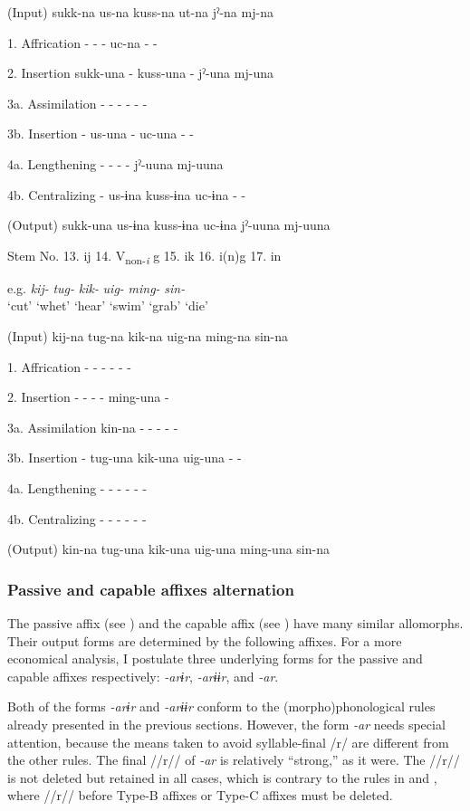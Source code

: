 \begin{table}
  (Input)  sukk-na  us-na  kuss-na  ut-na  jˀ-na  mj-na

1.  Affrication  -  -  -  uc-na  -  -

2.  Insertion  sukk-una  -  kuss-una  -  jˀ-una  mj-una

3a.  Assimilation  -  -  -  -  -  -

3b.  Insertion  -  us-una  -  uc-una  -  -

4a.  Lengthening  -  -  -  -  jˀ-uuna  mj-uuna

4b.  Centralizing  -  us-ɨna  kuss-ɨna  uc-ɨna  -  -

  (Output)  sukk-una  us-ɨna  kuss-ɨna  uc-ɨna  jˀ-uuna  mj-uuna

  Stem No.  13. ij  14. V\textsubscript{non-}\textit{\textsubscript{i}} g  15. ik  16. i(n)g    17. in

  e.g.  \textit{kij-}  \textit{tug-}  \textit{kik-}  \textit{uig-}  \textit{ming-}  \textit{sin-}\\
\glt ‘cut’  ‘whet’  ‘hear’  ‘swim’  ‘grab’  ‘die’

  (Input)  kij-na  tug-na  kik-na  uig-na  ming-na  sin-na

1.  Affrication  -  -  -  -  -  -

2.  Insertion  -  -  -  -  ming-una  -

3a.  Assimilation  kin-na  -  -  -  -  -

3b.  Insertion  -  tug-una  kik-una  uig-una  -  -

4a.  Lengthening  -  -  -  -  -  -

4b.  Centralizing  -  -  -  -  -  -

  (Output)  kin-na  tug-una  kik-una  uig-una  ming-una  sin-na
\end{table}

\subsubsection{Passive and capable affixes alternation}

The passive affix (see ) and the capable affix (see ) have many similar allomorphs. Their output forms are determined by the following affixes. For a more economical analysis, I postulate three underlying forms for the passive and capable affixes respectively: \textit{-arɨr}, \textit{-arɨɨr}, and \textit{-ar}.

Both of the forms \textit{-arɨr} and \textit{-arɨɨr} conform to the (morpho)phonological rules already presented in the previous sections. However, the form \textit{-ar} needs special attention, because the means taken to avoid syllable-final /r/ are different from the other rules. The final //r// of \textit{-ar} is relatively “strong,” as it were. The //r// is not deleted but retained in all cases, which is contrary to the rules in  and , where //r// before Type-B affixes or Type-C affixes must be deleted.

